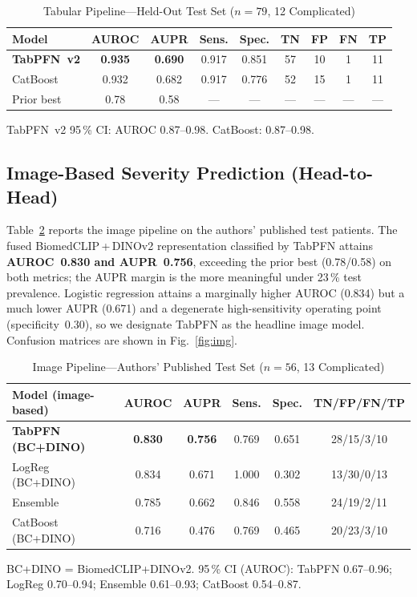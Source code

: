 \documentclass[journal]{IEEEtran}
\begin{document}
\begin{table}[!t]
\renewcommand{\arraystretch}{1.25}
\caption{Tabular Pipeline---Held-Out Test Set ($n=79$, 12 Complicated)}
\label{tab:tabular}
\centering
\footnotesize
\begin{tabular}{lcccccccc}
\toprule
Model & AUROC & AUPR & Sens. & Spec. & TN & FP & FN & TP \\
\midrule
\textbf{TabPFN~v2} & \textbf{0.935} & \textbf{0.690} & 0.917 & 0.851 & 57 & 10 & 1 & 11 \\
CatBoost          & 0.932          & 0.682          & 0.917 & 0.776 & 52 & 15 & 1 & 11 \\
Prior best~\cite{marcinkevics2024interpretable} & 0.78 & 0.58 & --- & --- & --- & --- & --- & --- \\
\bottomrule
\end{tabular}

\vspace{2pt}
\raggedright\scriptsize TabPFN~v2 95\,\% CI: AUROC 0.87--0.98. CatBoost: 0.87--0.98.
\end{table}

\subsection{Image-Based Severity Prediction (Head-to-Head)}
Table~\ref{tab:image} reports the image pipeline on the authors' published test
patients. The fused BiomedCLIP\,+\,DINOv2 representation classified by TabPFN attains
\textbf{AUROC~0.830 and AUPR~0.756}, exceeding the prior best (0.78/0.58) on both
metrics; the AUPR margin is the more meaningful under 23\,\% test prevalence. Logistic
regression attains a marginally higher AUROC (0.834) but a much lower AUPR (0.671) and a
degenerate high-sensitivity operating point (specificity~0.30), so we designate TabPFN
as the headline image model. Confusion matrices are shown in Fig.~\ref{fig:img}.

\begin{table}[!t]
\renewcommand{\arraystretch}{1.25}
\caption{Image Pipeline---Authors' Published Test Set ($n=56$, 13 Complicated)}
\label{tab:image}
\centering
\footnotesize
\begin{tabular}{lccccc}
\toprule
Model (image-based) & AUROC & AUPR & Sens. & Spec. & TN/FP/FN/TP \\
\midrule
\textbf{TabPFN (BC+DINO)} & \textbf{0.830} & \textbf{0.756} & 0.769 & 0.651 & 28/15/3/10 \\
LogReg (BC+DINO)          & 0.834 & 0.671 & 1.000 & 0.302 & 13/30/0/13 \\
Ensemble                  & 0.785 & 0.662 & 0.846 & 0.558 & 24/19/2/11 \\
CatBoost (BC+DINO)        & 0.716 & 0.476 & 0.769 & 0.465 & 20/23/3/10 \\
\bottomrule
\end{tabular}

\vspace{2pt}
\raggedright\scriptsize BC+DINO = BiomedCLIP+DINOv2. 95\,\% CI (AUROC): TabPFN
0.67--0.96; LogReg 0.70--0.94; Ensemble 0.61--0.93; CatBoost 0.54--0.87.
\end{table}
\end{document}
